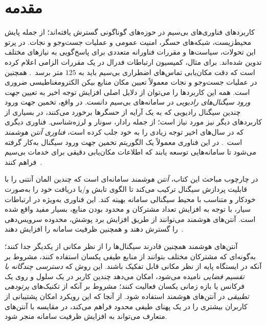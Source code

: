 \chapter{مقدمه}
\label{chap:introduction}

کاربردهای فناوری‌های بی‌سیم در حوزه‌های گوناگونی گسترش یافته‌اند؛ از جمله پایش محیط‌زیست، شبکه‌های حسگر، امنیت عمومی و عملیات جست‌وجو و نجات. در پرتو این تحولات، سیاست‌ها و مقررات فناورانه متعددی برای پاسخ‌گویی به نیازهای مختلف تدوین شده‌اند. برای مثال، کمیسیون ارتباطات فدرال در یک مقررات الزامی اعلام کرده است که دقت مکان‌یابی تماس‌های اضطراری بی‌سیم باید به $125$ متر برسد~\cite{1}. همچنین در عملیات جست‌وجو و نجات معمولاً تعیین مکان منابع بیکن الکترومغناطیسی ضروری است. همه این کاربردها را می‌توان از دلایل اصلی افزایش توجه اخیر به تعیین \textit{جهت ورود سیگنال‌های رادیویی} در سامانه‌های بی‌سیم دانست. در واقع، تخمین جهت ورود چندین سیگنال رادیویی که به یک آرایه از حسگرها برخورد می‌کنند، در بسیاری از کاربردهای دیگر نیز مورد نیاز است؛ از جمله رادار، سونار و لرزه‌شناسی. فناوری دیگری که در سال‌های اخیر توجه زیادی را به خود جلب کرده است، \textit{فناوری آنتن هوشمند} است~\cite{2,3}. در این فناوری معمولاً یک الگوریتم تخمین جهت ورود سیگنال به‌کار گرفته می‌شود تا سامانه‌هایی توسعه یابند که اطلاعات مکان‌یابی دقیقی برای خدمات بی‌سیم فراهم کنند~\cite{4}.

در چارچوب مباحث این کتاب، \textit{آنتن هوشمند} سامانه‌ای است که چندین المان آنتنی را با قابلیت پردازش سیگنال ترکیب می‌کند تا الگوی تابش و/یا دریافت خود را به‌صورت خودکار و متناسب با محیط سیگنالی سامانه بهینه کند. این فناوری به‌ویژه در ارتباطات سیار، با توجه به افزایش تعداد مشترکان و محدود بودن منابع، بسیار مفید واقع شده است. آنتن‌های هوشمند می‌توانند از طریق افزایش برد پوشش، محدوده سرویس‌دهی را گسترش دهند و همچنین ظرفیت سامانه را افزایش دهند~\cite{2,3}.

آنتن‌های هوشمند همچنین قادرند سیگنال‌ها را از نظر مکانی از یکدیگر جدا کنند؛ به‌گونه‌ای که مشترکان مختلف بتوانند از منابع طیفی یکسان استفاده کنند، مشروط بر آنکه در ایستگاه پایه از نظر مکانی قابل تفکیک باشند. این روش که \textit{دسترسی چندگانه با تقسیم فضایی} نامیده می‌شود، امکان می‌دهد چندین کاربر در یک سلول و روی یک فرکانس یا بازه زمانی یکسان فعالیت کنند؛ مشروط بر آنکه از تکنیک‌های \textit{پرتودهی تطبیقی} در آنتن‌های هوشمند استفاده شود. از آنجا که این رویکرد امکان پشتیبانی از کاربران بیشتری را در یک پهنای طیفی محدود فراهم می‌کند، در مقایسه با آنتن‌های متعارف می‌تواند به افزایش ظرفیت سامانه منجر شود.

